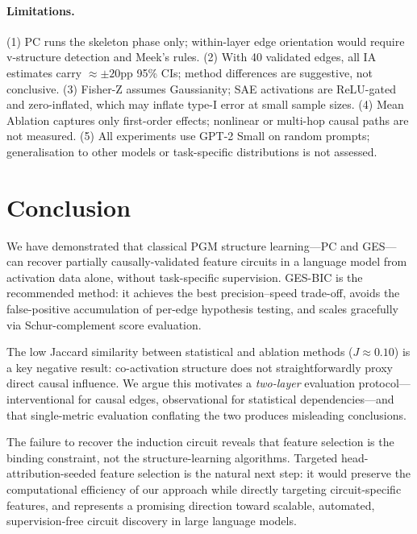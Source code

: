 \documentclass{article}
\begin{document}
\paragraph{Limitations.}
(1) PC runs the skeleton phase only; within-layer edge orientation would
require v-structure detection and Meek's rules.
(2) With 40 validated edges, all IA estimates carry $\approx\pm 20$pp 95\% CIs;
method differences are suggestive, not conclusive.
(3) Fisher-Z assumes Gaussianity; SAE activations are ReLU-gated and
zero-inflated, which may inflate type-I error at small sample sizes.
(4) Mean Ablation captures only first-order effects; nonlinear or multi-hop
causal paths are not measured.
(5) All experiments use GPT-2 Small on random prompts; generalisation to
other models or task-specific distributions is not assessed.

\section{Conclusion}

We have demonstrated that classical PGM structure learning---PC and GES---can
recover partially causally-validated feature circuits in a language model from
activation data alone, without task-specific supervision. GES-BIC is the
recommended method: it achieves the best precision--speed trade-off, avoids
the false-positive accumulation of per-edge hypothesis testing, and scales
gracefully via Schur-complement score evaluation.

The low Jaccard similarity between statistical and ablation methods
($J \approx 0.10$) is a key negative result: co-activation structure does not
straightforwardly proxy direct causal influence. We argue this motivates
a \emph{two-layer} evaluation protocol---interventional for causal edges,
observational for statistical dependencies---and that single-metric evaluation
conflating the two produces misleading conclusions.

The failure to recover the induction circuit reveals that feature selection is
the binding constraint, not the structure-learning algorithms. Targeted
head-attribution-seeded feature selection is the natural next step: it would
preserve the computational efficiency of our approach while directly targeting
circuit-specific features, and represents a promising direction toward scalable,
automated, supervision-free circuit discovery in large language models.
\end{document}
